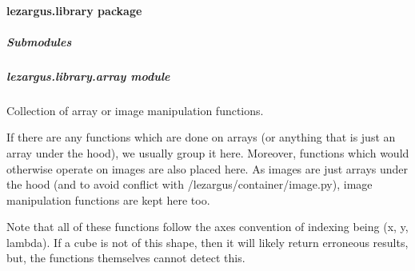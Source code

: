 \documentclass[letterpaper,11pt,english]{sphinxmanual}
\begin{document}
\sphinxstepscope


\paragraph{lezargus.library package}
\label{\detokenize{code/lezargus.library:lezargus-library-package}}\label{\detokenize{code/lezargus.library::doc}}

\subparagraph{Submodules}
\label{\detokenize{code/lezargus.library:submodules}}
\sphinxstepscope


\subparagraph{lezargus.library.array module}
\label{\detokenize{code/lezargus.library.array:module-lezargus.library.array}}\label{\detokenize{code/lezargus.library.array:lezargus-library-array-module}}\label{\detokenize{code/lezargus.library.array::doc}}
\sphinxAtStartPar
Collection of array or image manipulation functions.

\sphinxAtStartPar
If there are any functions which are done on arrays (or anything that is
just an array under the hood), we usually group it here. Moreover, functions
which would otherwise operate on images are also placed here. As images are
just arrays under the hood (and to avoid conflict with
/lezargus/container/image.py), image manipulation functions are kept here too.

\sphinxAtStartPar
Note that all of these functions follow the axes convention of indexing being
(x, y, lambda). If a cube is not of this shape, then it will likely return
erroneous results, but, the functions themselves cannot detect this.
\end{document}
